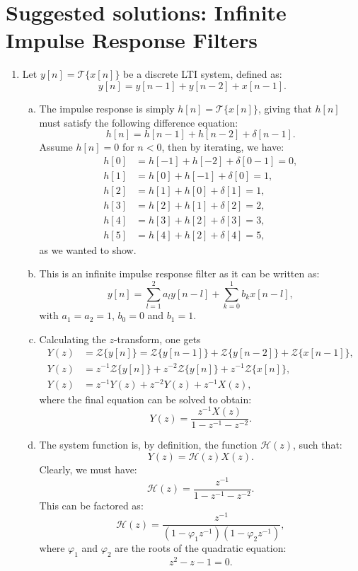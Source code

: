 \newpage
\section{Suggested solutions: Infinite Impulse Response Filters}

\begin{enumerate}
\item Let $y[n]=\mathcal{T}\{x[n]\}$ be a discrete LTI system, defined as:
$$y[n]=y[n-1]+y[n-2]+x[n-1].$$

\begin{enumerate}[a)]
\item The impulse response is simply $h[n]=\mathcal{T}\{x[n]\}$, giving that $h[n]$ must satisfy the following difference equation:
$$h[n]=h[n-1]+h[n-2]+\delta[n-1].$$
Assume $h[n]=0$ for $n<0$, then by iterating, we have:
\begin{align*}
    h[0]&= h[-1] + h[-2] + \delta[0-1]=0, \\
    h[1]&= h[0]  + h[-1] + \delta[0]=1, \\
    h[2]&= h[1]  + h[0]  + \delta[1]=1, \\
    h[3]&= h[2]  + h[1]  + \delta[2]=2, \\
    h[4]&= h[3]  + h[2]  + \delta[3]=3, \\
    h[5]&= h[4]  + h[2]  + \delta[4]=5, 
\end{align*}
as we wanted to show.

\item This is an infinite impulse response filter as it can be written as:
$$y[n]=\sum_{l=1}^{2} a_{l}y[n-l]+\sum_{k=0}^{1} b_{k}x[n-l],$$
with $a_{1}=a_{2}=1$, $b_{0}=0$ and $b_{1}=1$. 

\item Calculating the $z$-transform, one gets
\begin{align*}
    Y(z)&=\mathcal{Z}\{y[n]\}=\mathcal{Z}\{y[n-1]\}+\mathcal{Z}\{y[n-2]\}+\mathcal{Z}\{x[n-1]\}, \\
    Y(z)&=z^{-1}\mathcal{Z}\{y[n]\} + z^{-2}\mathcal{Z}\{y[n]\} + z^{-1}\mathcal{Z}\{x[n]\}, \\
    Y(z)&=z^{-1}Y(z) + z^{-2}Y(z) + z^{-1}X(z),
\end{align*}
where the final equation can be solved to obtain:
$$Y(z)=\frac{z^{-1}X(z)}{1-z^{-1}-z^{-2}}.$$

\item The system function is, by definition, the function $\mathcal{H}(z)$, such that:
$$Y(z)=\mathcal{H}(z)X(z).$$
Clearly, we must have:
$$\mathcal{H}(z)=\frac{z^{-1}}{1-z^{-1}-z^{-2}}.$$
This can be factored as:
$$\mathcal{H}(z)=\frac{z^{-1}}{(1-\varphi_{1}z^{-1})(1-\varphi_{2}z^{-1})},$$
where $\varphi_{1}$ and $\varphi_{2}$ are the roots of the quadratic equation:
$$z^{2}-z-1=0.$$


\end{enumerate}
\end{enumerate}
